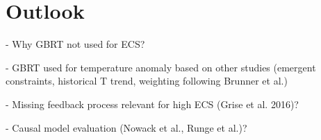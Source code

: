 \section{Outlook}
\label{sec:07:outlook}

- Why GBRT not used for ECS?

- GBRT used for temperature anomaly based on other studies (emergent
constraints, historical T trend, weighting following Brunner et al.)

- Missing feedback process relevant for high ECS (Grise et al. 2016)?

- Causal model evaluation (Nowack et al., Runge et al.)?
